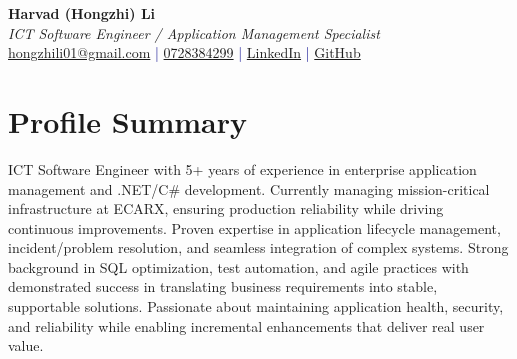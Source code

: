 \documentclass[11pt,a4paper]{article}
\begin{document}
\pagestyle{empty} %

\begin{center}
{\LARGE \textbf{Harvad (Hongzhi) Li}}\\[10pt]
{\Large \textit{ICT Software Engineer / Application Management Specialist}}\\[10pt]
\textcolor{darkblue}{\href{mailto:hongzhili01@google.com}{hongzhili01@gmail.com} | \href{tel:0728384299}{0728384299} | \href{https://www.linkedin.com/in/harvad/}{LinkedIn} | \href{https://github.com/bluehawana}{GitHub}}
\end{center}

\section*{Profile Summary}
ICT Software Engineer with 5+ years of experience in enterprise application management and .NET/C\# development. Currently managing mission-critical infrastructure at ECARX, ensuring production reliability while driving continuous improvements. Proven expertise in application lifecycle management, incident/problem resolution, and seamless integration of complex systems. Strong background in SQL optimization, test automation, and agile practices with demonstrated success in translating business requirements into stable, supportable solutions. Passionate about maintaining application health, security, and reliability while enabling incremental enhancements that deliver real user value.

\end{document}

